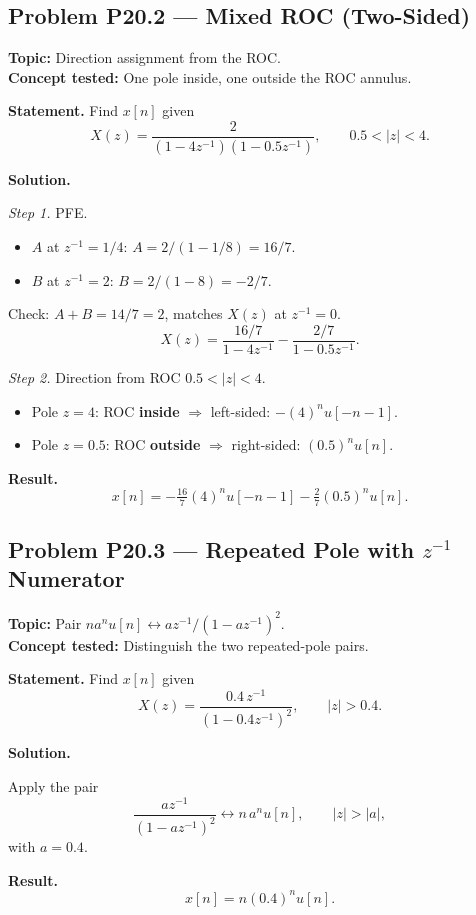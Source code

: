 \documentclass[11pt]{article}
\begin{document}
\subsection{Problem P20.2 --- Mixed ROC (Two-Sided)}
\textbf{Topic:} Direction assignment from the ROC.\\
\textbf{Concept tested:} One pole inside, one outside the ROC annulus.

\textbf{Statement.} Find $x[n]$ given
\[
X(z) = \frac{2}{(1-4z^{-1})(1-0.5z^{-1})},\qquad 0.5<|z|<4.
\]

\textbf{Solution.}

\textit{Step 1.} PFE.
\begin{itemize}
\item $A$ at $z^{-1}=1/4$: $A = 2/(1-1/8) = 16/7$.
\item $B$ at $z^{-1}=2$: $B = 2/(1-8) = -2/7$.
\end{itemize}
Check: $A+B = 14/7 = 2$, matches $X(z)$ at $z^{-1}=0$. \checkmark
\[
X(z) = \frac{16/7}{1-4z^{-1}} - \frac{2/7}{1-0.5z^{-1}}.
\]

\textit{Step 2.} Direction from ROC $0.5<|z|<4$.
\begin{itemize}
\item Pole $z=4$: ROC \textbf{inside} $\Rightarrow$ left-sided: $-(4)^{n}u[-n-1]$.
\item Pole $z=0.5$: ROC \textbf{outside} $\Rightarrow$ right-sided: $(0.5)^{n}u[n]$.
\end{itemize}

\textbf{Result.}
\[
\boxed{\,x[n] = -\tfrac{16}{7}(4)^{n}u[-n-1] - \tfrac{2}{7}(0.5)^{n}u[n].\,}
\]

\subsection{Problem P20.3 --- Repeated Pole with $z^{-1}$ Numerator}
\textbf{Topic:} Pair $na^{n}u[n]\leftrightarrow az^{-1}/(1-az^{-1})^{2}$.\\
\textbf{Concept tested:} Distinguish the two repeated-pole pairs.

\textbf{Statement.} Find $x[n]$ given
\[
X(z) = \frac{0.4\,z^{-1}}{(1-0.4z^{-1})^{2}},\qquad |z|>0.4.
\]

\textbf{Solution.}

Apply the pair
\[
\frac{a z^{-1}}{(1-a z^{-1})^{2}}\leftrightarrow n\,a^{n}u[n],\qquad |z|>|a|,
\]
with $a = 0.4$.

\textbf{Result.}
\[
\boxed{\,x[n] = n(0.4)^{n}u[n].\,}
\]
\end{document}
